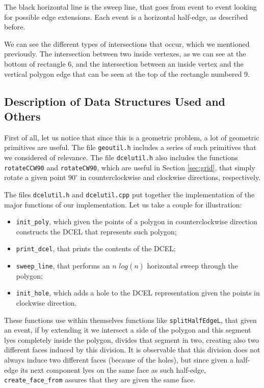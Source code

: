 \documentclass[12pt,a4paper,oneside]{article}
\begin{document}
The black horizontal line is the sweep line, that goes from event to event looking for possible edge extensions. Each event is a horizontal half-edge, as described before.

We can see the different types of intersections that occur, which we mentioned previously. The intersection between two inside vertexes, as we can see at the bottom of rectangle 6, and the intersection between an inside vertex and the vertical polygon edge that can be seen at the top of the rectangle numbered 9.

\subsection{Description of Data Structures Used and Others}\label{subsec:data}

First of all, let us notice that since this is a geometric problem, a lot of geometric primitives are useful. The file \texttt{geoutil.h} includes a series of such primitives that we considered of relevance. The file \texttt{dcelutil.h} also includes the functions \texttt{rotateCCW90} and \texttt{rotateCW90}, which are useful in Section \ref{sec:grid}, that simply rotate a given point $90^{\circ}$ in counterclockwise and clockwise directions, respectively.

The files \texttt{dcelutil.h} and \texttt{dcelutil.cpp} put together the implementation of the major functions of our implementation. Let us take a couple for illustration:

\begin{itemize}
	\item \texttt{init\_poly}, which given the points of a polygon in counterclockwise direction constructs the DCEL that represents such polygon;
	\item \texttt{print\_dcel}, that prints the contents of the DCEL;
	\item \texttt{sweep\_line}, that performs an $n$ $log\left( n \right)$ horizontal sweep through the polygon;
	\item \texttt{init\_hole}, which adds a hole to the DCEL representation given the points in clockwise direction.
\end{itemize}

These functions use within themselves functions like \texttt{splitHalfEdgeL}, that given an event, if by extending it we intersect a side of the polygon and this segment lyes completely inside the polygon, divides that segment in two, creating also two different faces induced by this division. It is observable that this division does not always induce two different faces (because of the holes), but since given a half-edge its next component lyes on the same face as such half-edge, \texttt{create\_face\_from} assures that they are given the same face.
\end{document}

